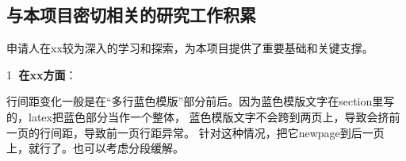 \subsection{与本项目密切相关的研究工作积累}
申请人在xx较为深入的学习和探索，为本项目提供了重要基础和关键支撑。

\textcircled{\small 1} {\bfseries 在xx方面}：

行间距变化一般是在“多行蓝色模版”部分前后。因为蓝色模版文字在section里写的，latex把蓝色部分当作一个整体，
蓝色模版文字不会跨到两页上，导致会挤前一页的行间距，导致前一页行距异常。
针对这种情况，把它newpage到后一页上，就行了。也可以考虑分段缓解。